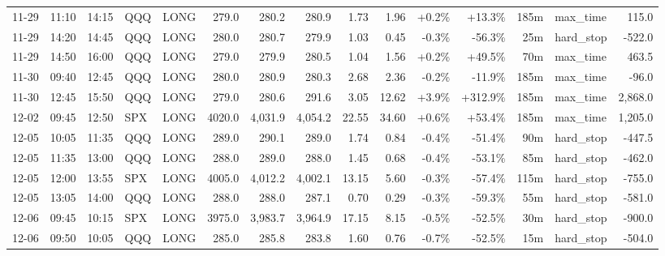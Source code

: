 \documentclass[11pt,a4paper,twoside]{article}
\begin{document}
\begin{landscape}
\begin{center}
\begin{longtable}{>{\color{txtmain}}l l l l l r r r r r r r r >{\color{txtmain}}l r}
11-29 & 11:10 & 14:15 & QQQ & LONG & 279.0 & 280.2 & 280.9 & 1.73 & 1.96 & \textcolor{wingreen}{+0.2\%} & \textcolor{wingreen}{+13.3\%} & 185m & max\_time & \textcolor{wingreen}{115.0} \\
11-29 & 14:20 & 14:45 & QQQ & LONG & 280.0 & 280.7 & 279.9 & 1.03 & 0.45 & \textcolor{lossred}{-0.3\%} & \textcolor{lossred}{-56.3\%} & 25m & hard\_stop & \textcolor{lossred}{-522.0} \\
11-29 & 14:50 & 16:00 & QQQ & LONG & 279.0 & 279.9 & 280.5 & 1.04 & 1.56 & \textcolor{wingreen}{+0.2\%} & \textcolor{wingreen}{+49.5\%} & 70m & max\_time & \textcolor{wingreen}{463.5} \\
11-30 & 09:40 & 12:45 & QQQ & LONG & 280.0 & 280.9 & 280.3 & 2.68 & 2.36 & \textcolor{lossred}{-0.2\%} & \textcolor{lossred}{-11.9\%} & 185m & max\_time & \textcolor{lossred}{-96.0} \\
11-30 & 12:45 & 15:50 & QQQ & LONG & 279.0 & 280.6 & 291.6 & 3.05 & 12.62 & \textcolor{wingreen}{+3.9\%} & \textcolor{wingreen}{+312.9\%} & 185m & max\_time & \textcolor{wingreen}{2,868.0} \\
12-02 & 09:45 & 12:50 & SPX & LONG & 4020.0 & 4,031.9 & 4,054.2 & 22.55 & 34.60 & \textcolor{wingreen}{+0.6\%} & \textcolor{wingreen}{+53.4\%} & 185m & max\_time & \textcolor{wingreen}{1,205.0} \\
12-05 & 10:05 & 11:35 & QQQ & LONG & 289.0 & 290.1 & 289.0 & 1.74 & 0.84 & \textcolor{lossred}{-0.4\%} & \textcolor{lossred}{-51.4\%} & 90m & hard\_stop & \textcolor{lossred}{-447.5} \\
12-05 & 11:35 & 13:00 & QQQ & LONG & 288.0 & 289.0 & 288.0 & 1.45 & 0.68 & \textcolor{lossred}{-0.4\%} & \textcolor{lossred}{-53.1\%} & 85m & hard\_stop & \textcolor{lossred}{-462.0} \\
12-05 & 12:00 & 13:55 & SPX & LONG & 4005.0 & 4,012.2 & 4,002.1 & 13.15 & 5.60 & \textcolor{lossred}{-0.3\%} & \textcolor{lossred}{-57.4\%} & 115m & hard\_stop & \textcolor{lossred}{-755.0} \\
12-05 & 13:05 & 14:00 & QQQ & LONG & 288.0 & 288.0 & 287.1 & 0.70 & 0.29 & \textcolor{lossred}{-0.3\%} & \textcolor{lossred}{-59.3\%} & 55m & hard\_stop & \textcolor{lossred}{-581.0} \\
12-06 & 09:45 & 10:15 & SPX & LONG & 3975.0 & 3,983.7 & 3,964.9 & 17.15 & 8.15 & \textcolor{lossred}{-0.5\%} & \textcolor{lossred}{-52.5\%} & 30m & hard\_stop & \textcolor{lossred}{-900.0} \\
12-06 & 09:50 & 10:05 & QQQ & LONG & 285.0 & 285.8 & 283.8 & 1.60 & 0.76 & \textcolor{lossred}{-0.7\%} & \textcolor{lossred}{-52.5\%} & 15m & hard\_stop & \textcolor{lossred}{-504.0} \\

\end{longtable}
\end{center}
\end{landscape}
\end{document}
